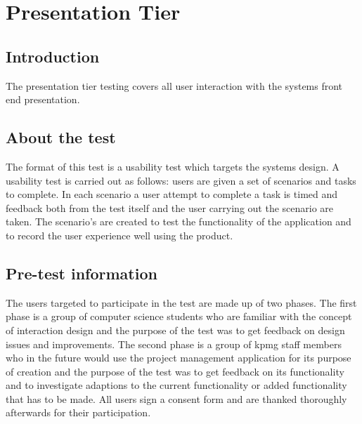 \documentclass[]{article}
\begin{document}
    \newpage
    \tableofcontents
	\clearpage
    
    \newpage
    \section{Presentation Tier}
	\subsection{Introduction}
	The presentation tier testing covers all user interaction with the systems front end presentation. 
	\subsection{About the test}
	The format of this test is a usability test which targets the systems design. A usability test is carried out as follows: users are given a set of scenarios and tasks to complete. In each scenario a user attempt to complete a task is timed and feedback both from the test itself and the user carrying out the scenario are taken. The scenario's are created to test the functionality of the application and to record the user experience well using the product. 
	\subsection{Pre-test information }
	The users targeted to participate in the test are made up of two phases. The first phase is a group of computer science students who are familiar with the concept of interaction design and the purpose of the test was to get feedback on design issues and improvements. The second phase is a group of kpmg staff members who in the future would use the project management application for its purpose of creation and the purpose of the test was to get feedback on its functionality and to investigate adaptions to the current functionality or added functionality that has to be made. All users sign a consent form and are thanked thoroughly afterwards for their participation.
\end{document}
